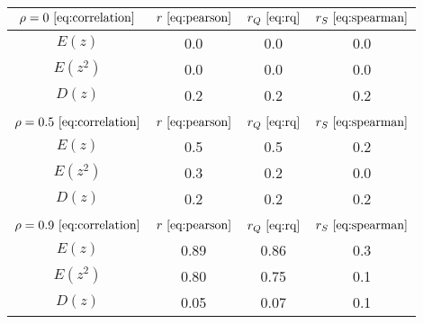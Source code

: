 \begin{tabular}{|c|c|c|c|}
\hline
$\rho = 0~\eqref{eq:correlation}$ & $r ~\eqref{eq:pearson}$ & $r_Q ~\eqref{eq:rq}$ & $r_S ~\eqref{eq:spearman}$\\
\hline
$E(z)$ & 0.0 & 0.0 & 0.0\\
\hline
$E(z^2)$ & 0.0 & 0.0 & 0.0\\
\hline
$D(z)$ & 0.2 & 0.2 & 0.2\\
\hline
 &  &  & \\
\hline
$\rho = 0.5~\eqref{eq:correlation}$ & $r ~\eqref{eq:pearson}$ & $r_Q ~\eqref{eq:rq}$ & $r_S ~\eqref{eq:spearman}$\\
\hline
$E(z)$ & 0.5 & 0.5 & 0.2\\
\hline
$E(z^2)$ & 0.3 & 0.2 & 0.0\\
\hline
$D(z)$ & 0.2 & 0.2 & 0.2\\
\hline
 &  &  & \\
\hline
$\rho = 0.9~\eqref{eq:correlation}$ & $r ~\eqref{eq:pearson}$ & $r_Q ~\eqref{eq:rq}$ & $r_S ~\eqref{eq:spearman}$\\
\hline
$E(z)$ & 0.89 & 0.86 & 0.3\\
\hline
$E(z^2)$ & 0.80 & 0.75 & 0.1\\
\hline
$D(z)$ & 0.05 & 0.07 & 0.1\\
\hline
\end{tabular}

